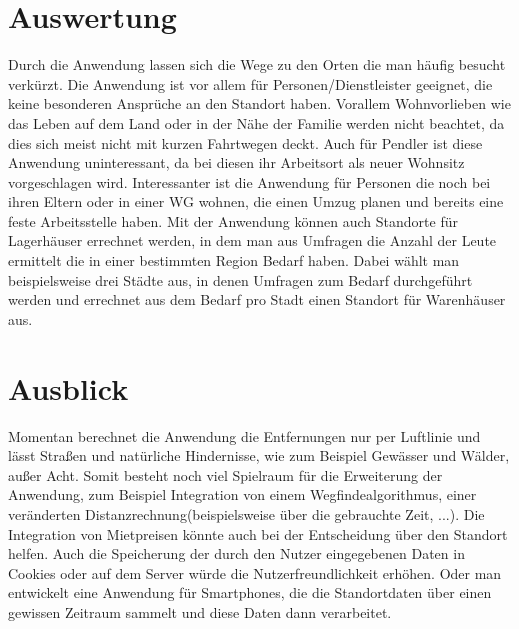 \documentclass[a4paper, 12pt]{scrreprt}
\begin{document}
\section{Auswertung}
Durch die Anwendung lassen sich die Wege zu den Orten die man häufig besucht verkürzt.
Die Anwendung ist vor allem für Personen/Dienstleister geeignet, die keine besonderen Ansprüche an den Standort haben.
Vorallem Wohnvorlieben wie das Leben auf dem Land oder in der Nähe der Familie werden nicht beachtet, da dies sich meist nicht mit kurzen Fahrtwegen deckt.
Auch für Pendler ist diese Anwendung uninteressant, da bei diesen ihr Arbeitsort als neuer Wohnsitz vorgeschlagen wird.
Interessanter ist die Anwendung für Personen die noch bei ihren Eltern oder in einer WG wohnen, die einen Umzug planen und bereits eine feste Arbeitsstelle haben.
Mit der Anwendung können auch Standorte für Lagerhäuser errechnet werden, in dem man aus Umfragen die Anzahl der Leute ermittelt die in einer bestimmten Region Bedarf haben.
Dabei wählt man beispielsweise drei Städte aus, in denen Umfragen zum Bedarf durchgeführt werden und errechnet aus dem Bedarf pro Stadt einen Standort für Warenhäuser aus.
\section{Ausblick}
Momentan berechnet die Anwendung die Entfernungen nur per Luftlinie und lässt Straßen und natürliche Hindernisse, wie zum Beispiel Gewässer und Wälder, außer Acht.
Somit besteht noch viel Spielraum für die Erweiterung der Anwendung, zum Beispiel Integration von einem Wegfindealgorithmus, einer veränderten Distanzrechnung(beispielsweise über die gebrauchte Zeit, ...).
Die Integration von Mietpreisen könnte auch bei der Entscheidung über den Standort helfen.
Auch die Speicherung der durch den Nutzer eingegebenen Daten in Cookies oder auf dem Server würde die Nutzerfreundlichkeit erhöhen. Oder man entwickelt eine Anwendung für Smartphones, die die Standortdaten über einen gewissen Zeitraum sammelt und diese Daten dann verarbeitet.
\end{document}
